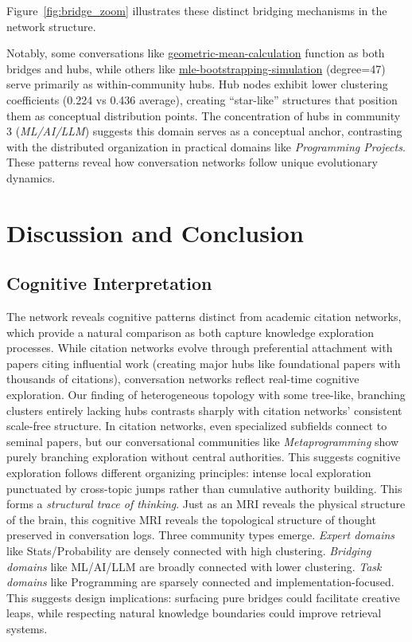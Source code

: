 \documentclass{svproc}
\begin{document}
Figure~\ref{fig:bridge_zoom} illustrates these distinct bridging mechanisms in the network structure.

Notably, some conversations like \url{geometric-mean-calculation} function as both bridges and hubs, while others like \url{mle-bootstrapping-simulation} (degree=47) serve primarily as within-community hubs. Hub nodes exhibit lower clustering coefficients (0.224 vs 0.436 average), creating ``star-like'' structures that position them as conceptual distribution points. The concentration of hubs in community 3 (\emph{ML/AI/LLM}) suggests this domain serves as a conceptual anchor, contrasting with the distributed organization in practical domains like \emph{Programming Projects}. These patterns reveal how conversation networks follow unique evolutionary dynamics.

\section{Discussion and Conclusion}

\subsection{Cognitive Interpretation}

The network reveals cognitive patterns distinct from academic citation networks, which provide a natural comparison as both capture knowledge exploration processes. While citation networks evolve through preferential attachment with papers citing influential work (creating major hubs like foundational papers with thousands of citations), conversation networks reflect real-time cognitive exploration. Our finding of heterogeneous topology with some tree-like, branching clusters entirely lacking hubs contrasts sharply with citation networks' consistent scale-free structure. In citation networks, even specialized subfields connect to seminal papers, but our conversational communities like \emph{Metaprogramming} show purely branching exploration without central authorities. This suggests cognitive exploration follows different organizing principles: intense local exploration punctuated by cross-topic jumps rather than cumulative authority building. This forms a \emph{structural trace of thinking}. Just as an MRI reveals the physical structure of the brain, this cognitive MRI reveals the topological structure of thought preserved in conversation logs. Three community types emerge. \emph{Expert domains} like Stats/Probability are densely connected with high clustering. \emph{Bridging domains} like ML/AI/LLM are broadly connected with lower clustering. \emph{Task domains} like Programming are sparsely connected and implementation-focused. This suggests design implications: surfacing pure bridges could facilitate creative leaps, while respecting natural knowledge boundaries could improve retrieval systems.
\end{document}
